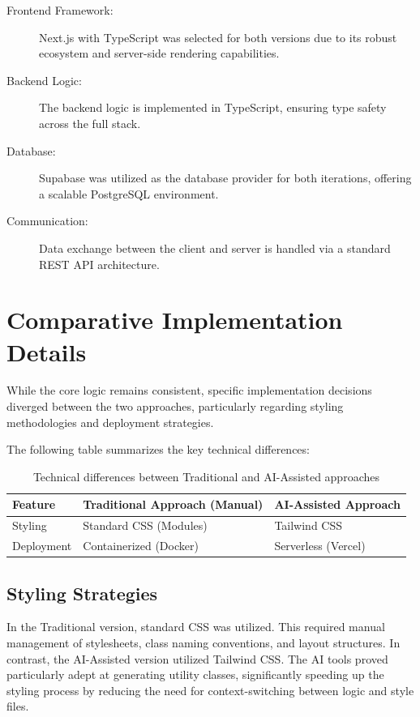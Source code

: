 \documentclass[a4paper,12pt]{report}
\begin{document}
\begin{description}
    \item[Frontend Framework:] Next.js with TypeScript was selected for both versions due to its robust ecosystem and server-side rendering capabilities.
    \item[Backend Logic:] The backend logic is implemented in TypeScript, ensuring type safety across the full stack.
    \item[Database:] Supabase was utilized as the database provider for both iterations, offering a scalable PostgreSQL environment.
    \item[Communication:] Data exchange between the client and server is handled via a standard REST API architecture.
\end{description}

\section{Comparative Implementation Details}

While the core logic remains consistent, specific implementation decisions diverged between the two approaches, particularly regarding styling methodologies and deployment strategies.

The following table summarizes the key technical differences:

\begin{table}[h]
\centering
\begin{tabular}{|l|l|l|}
\hline
\textbf{Feature} & \textbf{Traditional Approach (Manual)} & \textbf{AI-Assisted Approach} \\ \hline
Styling & Standard CSS (Modules) & Tailwind CSS \\ \hline
Deployment & Containerized (Docker) & Serverless (Vercel) \\ \hline
\end{tabular}
\caption{Technical differences between Traditional and AI-Assisted approaches}
\label{tab:implementation-comparison}
\end{table}

\subsection{Styling Strategies}

In the Traditional version, standard CSS was utilized. This required manual management of stylesheets, class naming conventions, and layout structures. In contrast, the AI-Assisted version utilized Tailwind CSS. The AI tools proved particularly adept at generating utility classes, significantly speeding up the styling process by reducing the need for context-switching between logic and style files.
\end{document}
